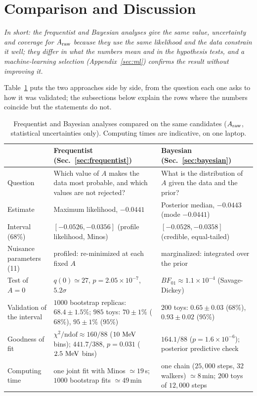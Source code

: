 \section{Comparison and Discussion}
\label{sec:comparison}
\emph{In short: the frequentist and Bayesian analyses give the same value, uncertainty and coverage for $A_{\mathrm{raw}}$ because they use the same likelihood and the data constrain it well; they differ in what the numbers mean and in the hypothesis tests, and a machine-learning selection (Appendix~\ref{sec:ml}) confirms the result without improving it.}

\label{sec:comparison_summary}
Table~\ref{tab:comparison} puts the two approaches side by side, from the question each one asks to how it was validated; the subsections below explain the rows where the numbers coincide but the statements do not.
\begin{table}[t]
\centering
\small
\begin{tabular}{p{2.6cm}p{6.6cm}p{6.6cm}}
\toprule
 & Frequentist (Sec.~\ref{sec:frequentist}) & Bayesian (Sec.~\ref{sec:bayesian}) \\
\midrule
Question & Which value of $A$ makes the data most probable, and which values are not rejected? & What is the distribution of $A$ given the data and the prior? \\
Estimate & Maximum likelihood, $-0.0441$ & Posterior median, $-0.0443$ (mode $-0.0441$) \\
Interval (68\%) & $[-0.0526,-0.0356]$ (profile likelihood, Minos) & $[-0.0528,-0.0358]$ (credible, equal-tailed) \\
Nuisance parameters (11) & profiled: re-minimized at each fixed $A$ & marginalized: integrated over the prior \\
Test of $A=0$ & $q(0)\simeq27$, $p=2.05\times10^{-7}$, $5.2\sigma$ & $BF_{01}\approx1.1\times10^{-4}$ (Savage-Dickey) \\
Validation of the interval & $1000$ bootstrap replicas: $68.4\pm1.5\%$; $985$ toys: $70\pm1\%$ ($68\%$), $95\pm1\%$ ($95\%$) & $200$ toys: $0.65\pm0.03$ ($68\%$), $0.93\pm0.02$ ($95\%$) \\
Goodness of fit & $\chi^2/\mathrm{ndof}\approx160/88$ ($10\,\,\text{Me\hspace{-.08em}V}$ bins); $441.7/388$, $p=0.031$ ($2.5\,\,\text{Me\hspace{-.08em}V}$ bins) & $164.1/88$ ($p=1.6\times10^{-6}$); posterior predictive check \\
Computing time & one joint fit with Minos $\simeq19\,$s; $1000$ bootstrap fits $\simeq49\,$min & one chain ($25{,}000$ steps, 32 walkers) $\simeq8\,$min; $200$ toys of $12{,}000$ steps \\
\bottomrule
\end{tabular}
\caption{Frequentist and Bayesian analyses compared on the same candidates ($A_{\mathrm{raw}}$, statistical uncertainties only). Computing times are indicative, on one laptop.}
\label{tab:comparison}
\end{table}



